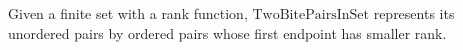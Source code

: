 \begin{definition}
Given a finite set with a rank function, \(\mathrm{TwoBitePairsInSet}\)
represents its unordered pairs by ordered pairs whose first endpoint has
smaller rank.
\end{definition}
